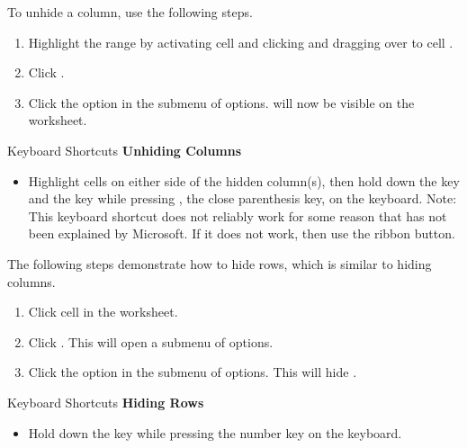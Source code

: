 To unhide a column, use the following steps.

\begin{enumerate}
	\item Highlight the range  by activating cell  and clicking and dragging over to cell .
	\item Click . 
	\item Click the  option in the submenu of options.  will now be visible on the worksheet.
\end{enumerate}

\begin{center}
	\begin{shtcutbox}{Keyboard Shortcuts}
		\textbf{Unhiding Columns}
		\\
		\begin{itemize}
			\setlength{\itemsep}{0pt}
			\setlength{\parskip}{0pt}
			\setlength{\parsep}{0pt}
			
			\item Highlight cells on either side of the hidden column(s), then hold down the  key and the  key while pressing \fmtKeystroke{)}, the close parenthesis key, on the keyboard. Note: This keyboard shortcut does not reliably work for some reason that has not been explained by Microsoft. If it does not work, then use the ribbon button.
			
		\end{itemize}
	\end{shtcutbox}
\end{center}

The following steps demonstrate how to hide rows, which is similar to hiding columns.

\begin{enumerate}
	\item Click cell  in the  worksheet.
	\item Click . This will open a submenu of options.
	\item Click the  option in the submenu of options. This will hide .
\end{enumerate}

\begin{center}
	\begin{shtcutbox}{Keyboard Shortcuts}
		\textbf{Hiding Rows}
		\\
		\begin{itemize}
			\setlength{\itemsep}{0pt}
			\setlength{\parskip}{0pt}
			\setlength{\parsep}{0pt}
			
			\item Hold down the  key while pressing the number  key on the keyboard.
			
		\end{itemize}
	\end{shtcutbox}
\end{center}

